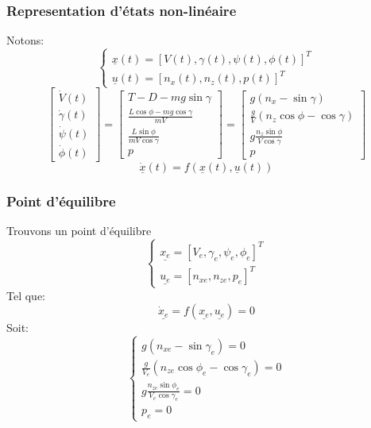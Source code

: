 \documentclass[tikz, footheight=2em]{beamer}
\begin{document}
\begin{frame}
    \frametitle{Representation d'états non-linéaire}\pause{}
    Notons:
    \[
    \left \{
    \begin{array}{l}
        \underline{x}(t) = {[V(t), \gamma (t), \psi (t), \phi (t)]}^{T}\\
        \underline{u}(t) = {[n_x(t), n_z(t), p(t)]}^{T}
    \end{array}
    \right.
    \]\pause{}
    \[
    \left[
    \begin{array}{c}
        \dot{V}(t)\\
        \dot{\gamma}(t)\\
        \dot{\psi}(t)\\
        \dot{\phi}(t)
    \end{array}
    \right]
    =
    \left[
    \begin{array}{c}
        T - D - mg \sin \gamma \\
        \frac{L\cos \phi - mg\cos \gamma}{mV} \\
        \frac{L\sin \phi}{mV\cos \gamma} \\
        p
    \end{array}
    \right]
    =
    \left[
    \begin{array}{c}
        g(n_x - \sin \gamma) \\
        \frac{g}{V}(n_z \cos \phi - \cos \gamma)\\
        g \frac{n_z \sin \phi}{V \cos \gamma} \\
        p
    \end{array}
    \right]
    \]\pause{}
    \[
    \underline{\dot{x}}(t)=f(\underline{x}(t),\underline{u}(t))
    \]
\end{frame}

\begin{frame}
    \frametitle{Point d'équilibre}\pause{}
    Trouvons un point d'équilibre
    \[
    \left \{
    \begin{array}{l}
        \underline{x_e} = {[V_e, \gamma_e, \psi_e, \phi_e]}^{T}\\
        \underline{u_e} = {[n_{xe}, n_{ze}, p_e]}^{T}
    \end{array}
    \right.
    \]
    Tel que:
    \[
    \underline{\dot{x}_e} = f(\underline{x_e}, \underline{u_e}) = 0
    \]\pause{}
    Soit:
    \[
    \left \{
    \begin{array}{l}
        g(n_{xe} - \sin \gamma_e) = 0\\
        \frac{g}{V_e}(n_{ze} \cos \phi_e - \cos \gamma_e) = 0\\
        g \frac{n_{ze} \sin \phi_e}{V_e \cos \gamma_e} = 0\\
        p_e = 0
    \end{array}
    \right.
    \]
\end{frame}
\end{document}
